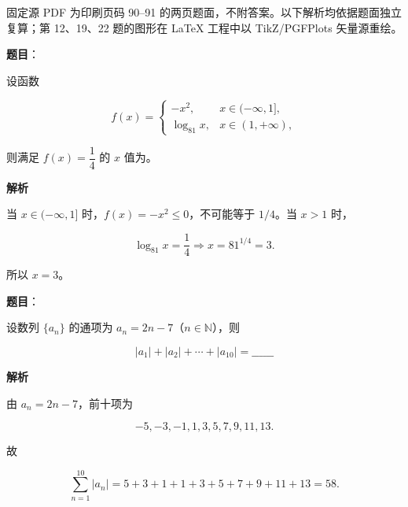 

\begin{gktip}
固定源 PDF 为印刷页码 90–91 的两页题面，不附答案。以下解析均依据题面独立复算；第 12、19、22 题的图形在 LaTeX 工程中以 TikZ/PGFPlots 矢量源重绘。
\end{gktip}


\begin{answer}

\textbf{题目}：

设函数

\nopagebreak[4]
\[
f(x)=
\begin{cases}
-x^2,&x\in(-\infty,1],\\
\log_{81}x,&x\in(1,+\infty),
\end{cases}
\]

则满足 $f(x)=\dfrac14$ 的 $x$ 值为\gkblank{}。

\textbf{解析}

当 $x\in(-\infty,1]$ 时，$f(x)=-x^2\le0$，不可能等于 $1/4$。当 $x>1$ 时，

\nopagebreak[4]
\[
\log_{81}x=\frac14
\Longrightarrow x=81^{1/4}=3.
\]

所以 $x=3$。


\end{answer}
\begin{answer}

\textbf{题目}：

设数列 $\{a_n\}$ 的通项为 $a_n=2n-7$（$n\in\mathbb N$），则

\nopagebreak[4]
\[
|a_1|+|a_2|+\cdots+|a_{10}|=\_\_\_\_\_\_
\]

\textbf{解析}

由 $a_n=2n-7$，前十项为

\nopagebreak[4]
\[
-5,-3,-1,1,3,5,7,9,11,13.
\]

故

\nopagebreak[4]
\[
\sum_{n=1}^{10}|a_n|
=5+3+1+1+3+5+7+9+11+13
=58.
\]


\end{answer}
